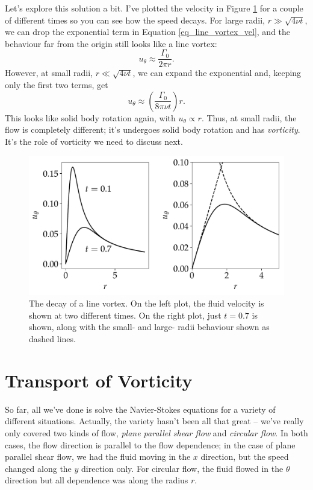 Let's explore this solution a bit.  I've plotted the velocity in Figure \ref{fig_line_vortex} for a couple of different times so you can see how the speed decays.  For large radii, $r \gg \sqrt{4\nu t}$, we can drop the exponential term in Equation \ref{eq_line_vortex_vel}, and the behaviour far from the origin still looks like a line vortex:
\[
u_\theta \approx \frac{\Gamma_0}{2\pi r}.
\]
However, at small radii, $r \ll \sqrt{4 \nu t}$, we can expand the exponential and, keeping only the first two terms, get
\[
u_\theta \approx \left( \frac{\Gamma_0}{8 \pi \nu t} \right) r.
\]
This looks like solid body rotation again, with $u_\theta \propto r$.  Thus, at small radii, the flow is completely different; it's undergoes solid body rotation and has \emph{vorticity}.  It's the role of vorticity we need to discuss next.

\begin{figure}
\centering
\includegraphics[width=0.8\linewidth]{Figures/Chapter2/fig_line_vortex}
\caption{The decay of a line vortex.  On the left plot, the fluid velocity is shown at two different times.  On the right plot, just $t=0.7$ is shown, along with the small- and large- radii behaviour shown as dashed lines.}
\label{fig_line_vortex}
\end{figure}

%
% 

\section{Transport of Vorticity}

So far, all we've done is solve the Navier-Stokes equations for a variety of different situations.  Actually, the variety hasn't been all that great -- we've really only covered two kinds of flow, \emph{plane parallel shear flow} and \emph{circular flow}.  In both cases, the flow direction is parallel to the flow dependence; in the case of plane parallel shear flow, we had the fluid moving in the $x$ direction, but the speed changed along the $y$ direction only.  For circular flow, the fluid flowed in the $\theta$ direction but all dependence was along the radius $r$.  

